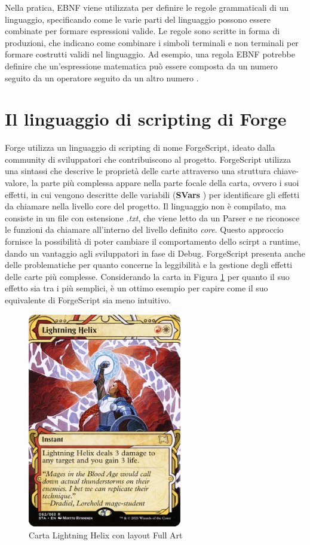 Nella pratica, EBNF viene utilizzata per definire le regole grammaticali di un linguaggio, specificando come le varie parti del linguaggio possono essere combinate per formare espressioni valide. Le regole sono scritte in forma di produzioni, che indicano come combinare i simboli terminali e non terminali per formare costrutti validi nel linguaggio. Ad esempio, una regola EBNF potrebbe definire che un'espressione matematica può essere composta da un numero seguito da un operatore seguito da un altro numero \cite{feynman2016ebnf}.

\section{Il linguaggio di scripting di Forge}\label{sec:forgescript}
Forge utilizza un linguaggio di scripting di nome ForgeScript, ideato dalla community di sviluppatori che contribuiscono al progetto. ForgeScript utilizza una sintassi che descrive le proprietà delle carte attraverso una struttura chiave-valore, la parte più complessa appare nella parte focale della carta, ovvero i suoi effetti, in cui vengono descritte delle variabili (\textbf{SVars} \cite{forge_api}) per identificare gli effetti da chiamare nella livello core del progetto. Il linguaggio non è compilato, ma consiste in un file con estensione \emph{.txt}, che viene letto da un Parser e ne riconosce le funzioni da chiamare all'interno del livello definito \emph{core}. Questo approccio fornisce la possibilità di poter cambiare il comportamento dello scirpt a runtime, dando un vantaggio agli sviluppatori in fase di Debug. ForgeScript  presenta anche delle problematiche per quanto concerne la leggibilità e la gestione degli effetti delle carte più complesse. Considerando la carta in Figura \ref{fig:lightning_helix} per quanto il suo effetto sia tra i più semplici, è un ottimo esempio per capire come il suo equivalente di ForgeScript sia meno intuitivo.

\begin{figure}
	\centering
	\includegraphics[width=0.6\textwidth]{Immagini/sta-62-lightning-helix.jpg}
	\caption{Carta Lightning Helix con layout Full Art}
	\label{fig:lightning_helix}
\end{figure}


